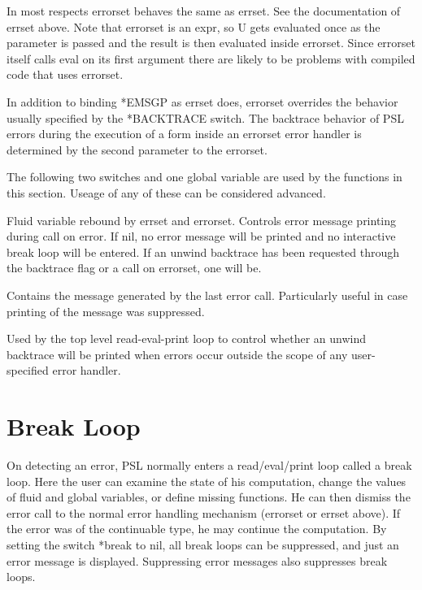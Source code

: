     In most respects errorset behaves the same as errset.    See
    the documentation of errset above.  Note that errorset is an
    expr,  so  U  gets evaluated once as the parameter is passed
    and the result is then  evaluated  inside  errorset.   Since
    errorset  itself  calls eval on its first argument there are
    likely to be problems with compiled code that uses errorset.

    In addition to  binding  *EMSGP  as  errset  does,  errorset
    overrides  the  behavior usually specified by the *BACKTRACE
    switch.  The backtrace behavior of  PSL  errors  during  the
    execution  of  a  form  inside  an errorset error handler is
    determined by the second parameter to the errorset.

  The following two switches and one global variable are used by
the functions in this section.  Useage of any of  these  can  be
considered advanced.

{
    Fluid  variable  rebound  by  errset and errorset.  Controls
    error message printing during call on error.    If  nil,  no
    error  message will be printed and no interactive break loop
    will be entered.  If an unwind backtrace has been  requested
    through  the  backtrace flag or a call on errorset, one will
    be.
}

{
    Contains the message generated   by  the  last  error  call.
    Particularly  useful  in  case  printing  of the message was
    suppressed.
}

{
    Used by  the  top  level  read-eval-print  loop  to  control
    whether  an  unwind  backtrace  will  be printed when errors
    occur outside the scope of any user-specified error handler.
}

\section{Break Loop}

  On detecting an error, PSL normally enters  a  read/eval/print
loop  called  a break loop.  Here the user can examine the state
of his computation,  change  the  values  of  fluid  and  global
variables, or define missing functions.  He can then dismiss the
error  call  to the normal error handling mechanism (errorset or
errset above).  If the error was of the continuable type, he may
continue the computation.  By setting the switch *break to  nil,
all  break loops can be suppressed, and just an error message is
displayed.  Suppressing error  messages  also  suppresses  break
loops.

